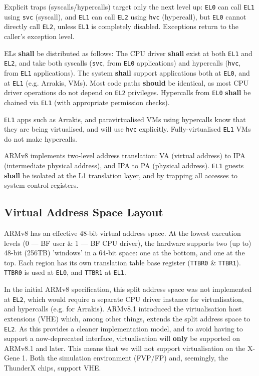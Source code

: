\documentclass[a4paper,twoside]{report}
\begin{document}
Explicit traps (syscalls/hypercalls) target only the next level up:
\texttt{EL0} can call \texttt{EL1} using \texttt{svc} (syscall), and
\texttt{EL1} can call \texttt{EL2} using \texttt{hvc} (hypercall), but
\texttt{EL0} cannot directly call \texttt{EL2}, unless \texttt{EL1} is
completely disabled.  Exceptions return to the caller's exception level.

ELs \textbf{shall} be distributed as follows: The CPU driver \textbf{shall}
exist at both \texttt{EL1} and \texttt{EL2}, and take both syscalls
(\texttt{svc}, from \texttt{EL0} applications) and hypercalls (\texttt{hvc},
from \texttt{EL1} applications). The system \textbf{shall} support
applications both at \texttt{EL0}, and at \texttt{EL1} (e.g.  Arrakis, VMs).
Most code paths \textbf{should} be identical, as most CPU driver operations do
not depend on \texttt{EL2} privileges.  Hypercalls from \texttt{EL0}
\textbf{shall} be chained via \texttt{EL1} (with appropriate permission
checks).

\texttt{EL1} apps such as Arrakis, and paravirtualised VMs using hypercalls
know that they are being virtualised, and will use \texttt{hvc} explicitly.
Fully-virtualised \texttt{EL1} VMs do not make hypercalls.

ARMv8 implements two-level address translation: VA (virtual address) to IPA
(intermediate physical address), and IPA to PA (physical address).
\texttt{EL1} guests \textbf{shall} be isolated at the L1 translation layer,
and by trapping all accesses to system control registers.

\subsection{Virtual Address Space Layout}\label{s:layout}

ARMv8 has an effective 48-bit virtual address space. At the lowest execution
levels (0 --- BF user \& 1 --- BF CPU driver), the hardware supports two (up to)
48-bit (256TB) 'windows' in a 64-bit space: one at the bottom, and one at the
top.  Each region has its own translation table base register (\texttt{TTBR0}
\& \texttt{TTBR1}). \texttt{TTBR0} is used at \texttt{EL0}, and \texttt{TTBR1}
at \texttt{EL1}.

In the initial ARMv8 specification, this split address space was not
implemented at \texttt{EL2}, which would require a separate CPU driver
instance for virtualisation, and hypercalls (e.g. for Arrakis). ARMv8.1
introduced the virtualisation host extensions (VHE) which, among other things,
extends the split address space to \texttt{EL2}. As this provides a cleaner
implementation model, and to avoid having to support a now-deprecated
interface, virtualisation will \textbf{only} be supported on ARMv8.1 and
later. This means that we will not support virtualisation on the X-Gene 1.
Both the simulation environment (FVP/FP) and, seemingly, the ThunderX chips,
support VHE.
\end{document}
